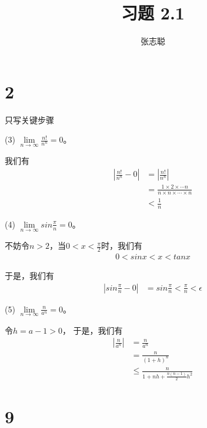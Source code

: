 \documentclass{article}
\begin{document}
\title{习题 2.1}
\author{张志聪}
\maketitle

\section*{2}

只写关键步骤

(3) $\lim\limits_{n \to \infty} \frac{n!}{n^n} = 0$。

我们有
\begin{align*}
  |\frac{n!}{n^n} - 0|
   & = |\frac{n!}{n^n}|                                                     \\
   & = \frac{1 \times 2 \times \cdots n}{n \times n \times \cdots \times n} \\
   & < \frac{1}{n}
\end{align*}

(4) $\lim\limits_{n \to \infty} sin \frac{\pi}{n} = 0$。

不妨令$n > 2$，当$0 < x < \frac{\pi}{2}$时，我们有
\begin{align*}
  0 < sin x < x < tan x
\end{align*}

于是，我们有
\begin{align*}
  |sin \frac{\pi}{n} - 0|
   & = sin \frac{\pi}{n} < \frac{\pi}{n} < \epsilon
\end{align*}

(5) $\lim\limits_{n \to \infty} \frac{n}{a^n} = 0$。

令$h = a - 1 > 0$，
于是，我们有
\begin{align*}
  |\frac{n}{a^n}|
   & = \frac{n}{a^n}       \\
   & = \frac{n}{(1 + h)^n} \\
   & \leq \frac{n}{1 + nh + \frac{n(n-1)}{2}h^2}
\end{align*}

\section*{9}
\end{document}
